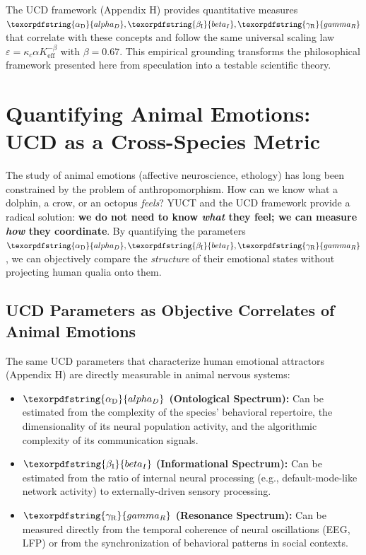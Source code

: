 \documentclass[12pt,a4paper]{article}
\DeclareRobustCommand{\alD}{\texorpdfstring{\ensuremath{\alpha_{\mathrm{D}}}}{alpha_D}}
\DeclareRobustCommand{\beI}{\texorpdfstring{\ensuremath{\beta_{\mathrm{I}}}}{beta_I}}
\DeclareRobustCommand{\gaR}{\texorpdfstring{\ensuremath{\gamma_{\mathrm{R}}}}{gamma_R}}
\newcommand{\eff}{\mathrm{eff}}
\newcommand{\Ke}{K_{\eff}}
\begin{document}
	The UCD framework (Appendix H) provides quantitative measures \(\alD, \beI, \gaR\) that correlate with these concepts and follow the same universal scaling law \(\varepsilon = \kappa_c \alpha \Ke^{-\beta}\) with \(\beta = 0.67\). This empirical grounding transforms the philosophical framework presented here from speculation into a testable scientific theory.
	
	\section{Quantifying Animal Emotions: UCD as a Cross-Species Metric}
	
	The study of animal emotions (affective neuroscience, ethology) has long been constrained by the problem of anthropomorphism. How can we know what a dolphin, a crow, or an octopus \textit{feels}? YUCT and the UCD framework provide a radical solution: \textbf{we do not need to know \textit{what} they feel; we can measure \textit{how} they coordinate}. By quantifying the parameters \(\alD, \beI, \gaR\), we can objectively compare the \textit{structure} of their emotional states without projecting human qualia onto them.
	
	\subsection{UCD Parameters as Objective Correlates of Animal Emotions}
	
	The same UCD parameters that characterize human emotional attractors (Appendix H) are directly measurable in animal nervous systems:
	
	\begin{itemize}
		\item \textbf{\(\alD\) (Ontological Spectrum):} Can be estimated from the complexity of the species' behavioral repertoire, the dimensionality of its neural population activity, and the algorithmic complexity of its communication signals.
		\item \textbf{\(\beI\) (Informational Spectrum):} Can be estimated from the ratio of internal neural processing (e.g., default-mode-like network activity) to externally-driven sensory processing.
		\item \textbf{\(\gaR\) (Resonance Spectrum):} Can be measured directly from the temporal coherence of neural oscillations (EEG, LFP) or from the synchronization of behavioral patterns in social contexts.
	\end{itemize}
	
\end{document}
